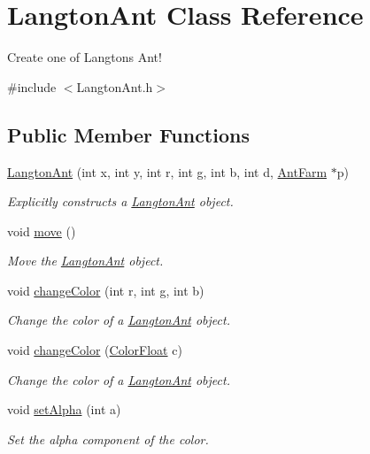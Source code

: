 \hypertarget{class_langton_ant}{}\section{Langton\+Ant Class Reference}
\label{class_langton_ant}


Create one of Langton\textquotesingle{}s Ant!  




{\ttfamily \#include $<$Langton\+Ant.\+h$>$}

\subsection*{Public Member Functions}
\begin{DoxyCompactItemize}
\item 
\hyperlink{class_langton_ant_ac3947796f9411f19c9dd547a1b89cf03}{Langton\+Ant} (int x, int y, int r, int g, int b, int d, \hyperlink{class_ant_farm}{Ant\+Farm} $\ast$p)
\begin{DoxyCompactList}\small\item\em Explicitly constructs a \hyperlink{class_langton_ant}{Langton\+Ant} object. \end{DoxyCompactList}\item 
void \hyperlink{class_langton_ant_acf17f14d78270a32b66273d83d8900c1}{move} ()
\begin{DoxyCompactList}\small\item\em Move the \hyperlink{class_langton_ant}{Langton\+Ant} object. \end{DoxyCompactList}\item 
void \hyperlink{class_langton_ant_ab5d2f1dc402bd5c6aa6552aad1ca50ca}{change\+Color} (int r, int g, int b)
\begin{DoxyCompactList}\small\item\em Change the color of a \hyperlink{class_langton_ant}{Langton\+Ant} object. \end{DoxyCompactList}\item 
void \hyperlink{class_langton_ant_a940dc3a5c0286ee91dd863ece7dc3998}{change\+Color} (\hyperlink{structtsgl_1_1_color_float}{Color\+Float} c)
\begin{DoxyCompactList}\small\item\em Change the color of a \hyperlink{class_langton_ant}{Langton\+Ant} object. \end{DoxyCompactList}\item 
void \hyperlink{class_langton_ant_a5fd5b25e776cfe96abe70300d022e333}{set\+Alpha} (int a)
\begin{DoxyCompactList}\small\item\em Set the alpha component of the color. \end{DoxyCompactList}\end{DoxyCompactItemize}
